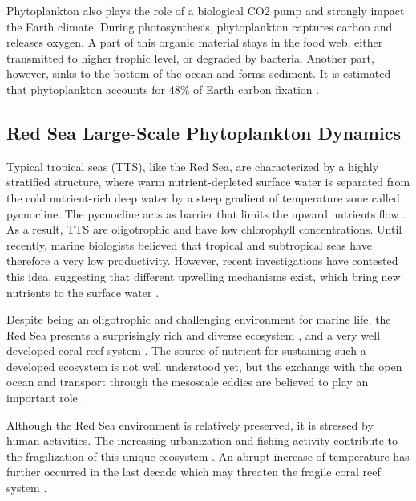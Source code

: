 Phytoplankton also plays the role of a biological CO2 pump and strongly impact the Earth climate. During photosynthesis, phytoplankton captures carbon and releases oxygen. A part of this organic material stays in the food web, either transmitted to higher trophic level, or degraded  by bacteria. Another part, however, sinks to the bottom of the ocean and forms sediment. It is estimated that phytoplankton accounts for 48\% of Earth carbon fixation \citep{Pal2014}.

\subsection{Red Sea Large-Scale Phytoplankton Dynamics}

Typical tropical seas (TTS), like the Red Sea, are characterized by a highly stratified structure, where warm nutrient-depleted surface water is separated from the cold nutrient-rich deep water by a steep gradient of temperature zone called pycnocline. The pycnocline acts as barrier that limits the upward nutrients flow \citep{Mann2006}. As a result, TTS are oligotrophic and have low chlorophyll concentrations. Until recently, marine biologists believed that tropical and subtropical seas have therefore a very low productivity. However, recent investigations have contested this idea, suggesting that different upwelling mechanisms exist, which bring new nutrients to the surface water \citep{Mann2006}.

Despite being an oligotrophic and challenging environment for marine life, the Red Sea presents a surprisingly rich and diverse ecosystem \citep{Raitsos2011}, and a very well developed coral reef system \citep{Racault}. The source of nutrient for sustaining such a developed ecosystem is not well understood yet, but the exchange with the open ocean and transport through the mesoscale eddies are believed to play an important role \citep{Raitsos2013, Zhan2014}.

Although the Red Sea environment is relatively preserved, it is stressed by human activities. The increasing urbanization and fishing activity contribute to the fragilization of this unique ecosystem \citep{Acker2008}. An abrupt increase of temperature has further occurred in the last decade which may threaten the fragile coral reef system \citep{Raitsos2011}.

